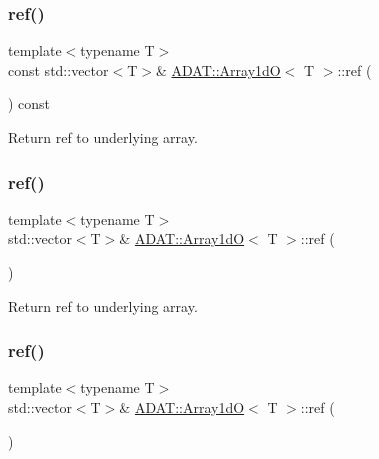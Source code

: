 \subsubsection{\texorpdfstring{ref()}{ref()}\hspace{0.1cm}{\footnotesize\ttfamily [3/6]}}
{\footnotesize\ttfamily template$<$typename T$>$ \\
const std\+::vector$<$T$>$\& \mbox{\hyperlink{classADAT_1_1Array1dO}{A\+D\+A\+T\+::\+Array1dO}}$<$ T $>$\+::ref (\begin{DoxyParamCaption}{ }\end{DoxyParamCaption}) const\hspace{0.3cm}{\ttfamily [inline]}}



Return ref to underlying array. 

\mbox{\label{classADAT_1_1Array1dO_ac3ff9b35bef8e7fa276136673b907749}} 
\subsubsection{\texorpdfstring{ref()}{ref()}\hspace{0.1cm}{\footnotesize\ttfamily [4/6]}}
{\footnotesize\ttfamily template$<$typename T$>$ \\
std\+::vector$<$T$>$\& \mbox{\hyperlink{classADAT_1_1Array1dO}{A\+D\+A\+T\+::\+Array1dO}}$<$ T $>$\+::ref (\begin{DoxyParamCaption}{ }\end{DoxyParamCaption})\hspace{0.3cm}{\ttfamily [inline]}}



Return ref to underlying array. 

\mbox{\label{classADAT_1_1Array1dO_ac3ff9b35bef8e7fa276136673b907749}} 
\subsubsection{\texorpdfstring{ref()}{ref()}\hspace{0.1cm}{\footnotesize\ttfamily [5/6]}}
{\footnotesize\ttfamily template$<$typename T$>$ \\
std\+::vector$<$T$>$\& \mbox{\hyperlink{classADAT_1_1Array1dO}{A\+D\+A\+T\+::\+Array1dO}}$<$ T $>$\+::ref (\begin{DoxyParamCaption}{ }\end{DoxyParamCaption})\hspace{0.3cm}{\ttfamily [inline]}}



